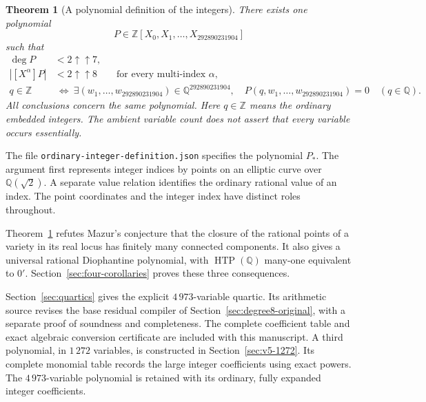 \documentclass[11pt]{article}
\newtheorem{theorem}{Theorem}[section]
\theoremstyle{definition}
\theoremstyle{remark}
\newcommand{\Q}{\mathbb Q}
\newcommand{\Z}{\mathbb Z}
\newcommand{\tw}[1]{2\mathbin{\uparrow\!\uparrow}#1}
\begin{document}
\begin{theorem}[A polynomial definition of the integers]\label{thm:target}
There exists one polynomial
\[
 P\in\Z[X_0,X_1,\ldots,X_{292890231904}]
\]
such that
\begin{align*}
 \deg P&<\tw7,\\
 |[X^\alpha]P|&<\tw8\qquad\text{for every multi-index }\alpha,\\
 q\in\Z&\ \Longleftrightarrow\
 \exists(w_1,\ldots,w_{292890231904})\in\Q^{292890231904},\quad
 P(q,w_1,\ldots,w_{292890231904})=0\quad(q\in\Q).
\end{align*}
All conclusions concern the same polynomial. Here $q\in\Z$ means the
ordinary embedded integers. The ambient variable count does not assert that
every variable occurs essentially.
\end{theorem}

The file \nolinkurl{ordinary-integer-definition.json} specifies the
polynomial $P_*$. The argument first represents integer indices by points
on an elliptic curve over $\Q(\sqrt2)$. A separate value relation identifies
the ordinary rational value of an index. The point coordinates and the
integer index have distinct roles throughout.

Theorem~\ref{thm:target} refutes Mazur's conjecture that the closure of
the rational points of a variety in its real locus has finitely many
connected components. It also gives a universal rational Diophantine
polynomial, with
$\operatorname{HTP}(\Q)$ many-one equivalent to $0'$.
Section~\ref{sec:four-corollaries} proves these three consequences.

Section~\ref{sec:quartics} gives the explicit $4\,973$-variable quartic.
Its arithmetic source revises the base residual compiler of
Section~\ref{sec:degree8-original}, with a separate proof of soundness and
completeness. The complete coefficient table and exact algebraic conversion
certificate are included with this manuscript.
A third polynomial, in $1\,272$ variables, is constructed in
Section~\ref{sec:v5-1272}. Its complete monomial table records the large
integer coefficients using exact powers. The $4\,973$-variable polynomial
is retained with its ordinary, fully expanded integer coefficients.
\end{document}
